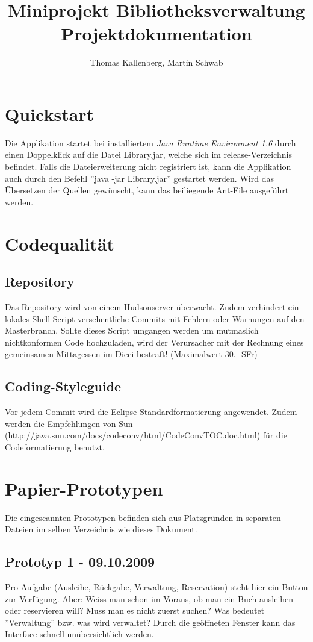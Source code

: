 \documentclass[10pt, a4paper]{scrartcl}
\title{Miniprojekt Bibliotheksverwaltung \\ \normalsize{Projektdokumentation}}
\author{Thomas Kallenberg, Martin Schwab}
\begin{document}
\maketitle
\section{Quickstart}
Die Applikation startet bei installiertem \textit{Java Runtime Environment 1.6} durch einen Doppelklick auf die Datei Library.jar, welche sich im release-Verzeichnis befindet. Falls die Dateierweiterung nicht registriert ist, kann die Applikation auch durch den Befehl ''java -jar Library.jar'' gestartet werden. Wird das Übersetzen der Quellen gewünscht, kann das beiliegende Ant-File ausgeführt werden. 

\section{Codequalität}
\subsection{Repository}
Das Repository wird von einem Hudsonserver überwacht. Zudem verhindert ein lokales Shell-Script versehentliche Commits mit Fehlern oder Warnungen auf den Masterbranch. Sollte dieses Script umgangen werden um mutmaslich nichtkonformen Code hochzuladen, wird der Verursacher mit der Rechnung eines gemeinsamen Mittagessen im Dieci bestraft! (Maximalwert 30.- SFr)

\subsection{Coding-Styleguide}
Vor jedem Commit wird die Eclipse-Standardformatierung angewendet. Zudem werden die Empfehlungen von Sun (http://java.sun.com/docs/codeconv/html/CodeConvTOC.doc.html) für die Codeformatierung benutzt.

\section{Papier-Prototypen}
Die eingescannten Prototypen befinden sich aus Platzgründen in separaten Dateien im selben Verzeichnis wie dieses Dokument.

\subsection{Prototyp 1 - 09.10.2009}
Pro Aufgabe (Ausleihe, Rückgabe, Verwaltung, Reservation) steht hier ein Button zur Verfügung. Aber: Weiss man schon im Voraus, ob man ein Buch ausleihen oder reservieren will? Muss man es nicht zuerst suchen? Was bedeutet ''Verwaltung'' bzw. was wird verwaltet? Durch die geöffneten Fenster kann das Interface schnell unübersichtlich werden.
\end{document}
